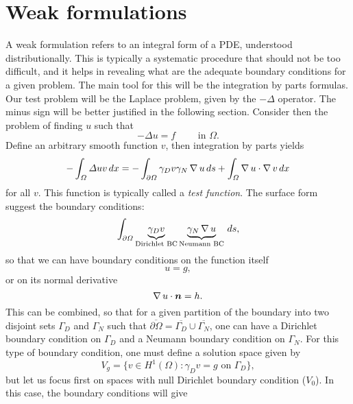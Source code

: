 \section{Weak formulations}
A weak formulation refers to an integral form of a PDE, understood distributionally. This is typically a systematic procedure that should not be too difficult, and it helps in revealing what are the adequate boundary conditions for a given problem. The main tool for this will be the integration by parts formulas. Our test problem will be the Laplace problem, given by the $-\Delta$ operator. The minus sign will be better justified in the following section. Consider then the problem of finding $u$ such that 
\begin{equation}
    -\Delta u = f \qquad \text{ in $\Omega$}.
\end{equation}
Define an arbitrary smooth function $v$, then integration by parts yields
\begin{equation}\label{eq:ibp-poisson}
    - \int_\Omega \Delta u v\,dx = -\int_{\partial\Omega}\gamma_D v \gamma_N \operatorname{\nabla} u \,ds + \int_\Omega \operatorname{\nabla} u \cdot \operatorname{\nabla} v\,dx
\end{equation}
for all $v$. This function is typically called a \emph{test function}. The surface form suggest the boundary conditions: 
\begin{equation}
    \int_{\partial\Omega}\underbrace{\gamma_D v}_\text{Dirichlet BC} \underbrace{\gamma_N \operatorname{\nabla} u}_\text{Neumann BC} \,ds,
\end{equation}
so that we can have boundary conditions on the function itself  
\begin{equation*}
    u = g,
\end{equation*}
or on its normal derivative
\begin{equation*}
    \grad u \cdot \vec n = h.
\end{equation*}
This can be combined, so that for a given partition of the boundary into two disjoint sets $\Gamma_D$ and $\Gamma_N$ such that $\overline{\partial\Omega} = \overline{\Gamma_D}\cup\overline{\Gamma_N}$, one can have a Dirichlet boundary condition on $\Gamma_D$ and a Neumann boundary condition on $\Gamma_N$. For this type of boundary condition, one must define a solution space given by 
\begin{equation}
    V_g = \{v \in H^1(\Omega): \gamma_D v = g \text{ on $\Gamma_D$}\},
\end{equation}
but let us focus first on spaces with null Dirichlet boundary condition ($V_0$). In this case, the boundary conditions will give
